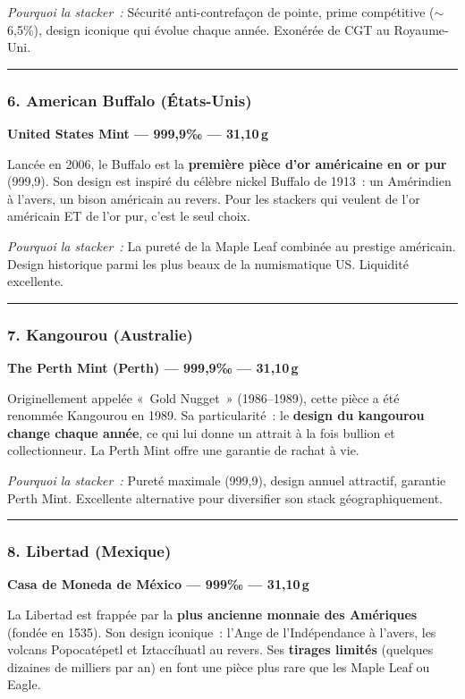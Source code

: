 \documentclass[14pt,a4paper]{extarticle}
\newcommand{\permil}{‰}
\newcommand{\goldsep}{%
  \begin{center}
    \textcolor{gold}{\rule{6cm}{0.4pt}}
  \end{center}
}
\begin{document}
\textit{Pourquoi la stacker~:} Sécurité anti-contrefaçon de pointe, prime compétitive ($\sim$6,5\%), design iconique qui évolue chaque année. Exonérée de CGT au Royaume-Uni.


\goldsep

\subsubsection{6. American Buffalo (États-Unis)}

\textbf{United States Mint --- 999,9\permil{} --- 31,10\,g}

Lancée en 2006, le Buffalo est la \textbf{première pièce d'or américaine en or pur} (999,9). Son design est inspiré du célèbre nickel Buffalo de 1913~: un Amérindien à l'avers, un bison américain au revers. Pour les stackers qui veulent de l'or américain ET de l'or pur, c'est le seul choix.

\textit{Pourquoi la stacker~:} La pureté de la Maple Leaf combinée au prestige américain. Design historique parmi les plus beaux de la numismatique US. Liquidité excellente.


\goldsep

\subsubsection{7. Kangourou (Australie)}

\textbf{The Perth Mint (Perth) --- 999,9\permil{} --- 31,10\,g}

Originellement appelée «~Gold Nugget~» (1986--1989), cette pièce a été renommée Kangourou en 1989. Sa particularité~: le \textbf{design du kangourou change chaque année}, ce qui lui donne un attrait à la fois bullion et collectionneur. La Perth Mint offre une garantie de rachat à vie.

\textit{Pourquoi la stacker~:} Pureté maximale (999,9), design annuel attractif, garantie Perth Mint. Excellente alternative pour diversifier son stack géographiquement.


\goldsep

\subsubsection{8. Libertad (Mexique)}

\textbf{Casa de Moneda de México --- 999\permil{} --- 31,10\,g}

La Libertad est frappée par la \textbf{plus ancienne monnaie des Amériques} (fondée en 1535). Son design iconique~: l'Ange de l'Indépendance à l'avers, les volcans Popocatépetl et Iztaccíhuatl au revers. Ses \textbf{tirages limités} (quelques dizaines de milliers par an) en font une pièce plus rare que les Maple Leaf ou Eagle.
\end{document}
